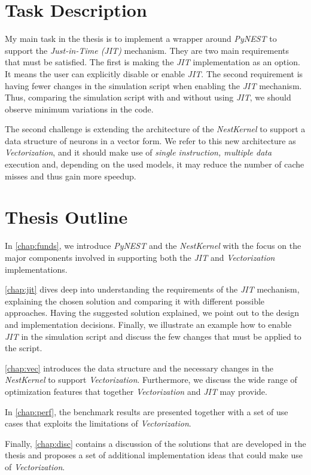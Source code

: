 \section{Task Description}
My main task in the thesis is to implement a wrapper around \emph{PyNEST} to support the \emph{Just-in-Time (JIT)} mechanism. They are two main requirements that must be satisfied. The first is making the \emph{JIT} implementation as an option. It means the user can explicitly disable or enable \emph{JIT}. The second requirement is having fewer changes in the simulation script when enabling the \emph{JIT} mechanism. Thus, comparing the simulation script with and without using \emph{JIT}, we should observe minimum variations in the code.

The second challenge is extending the architecture of the \emph{NestKernel} to support a data structure of neurons in a vector form. We refer to this new architecture as \emph{Vectorization}, and it should make use of \emph{single instruction, multiple data} execution and, depending on the used models, it may reduce the number of cache misses and thus gain more speedup.
\section{Thesis Outline}


In \autoref{chap:funds}, we introduce \emph{PyNEST} and the \emph{NestKernel} with the focus on the major components involved in supporting both the \emph{JIT} and \emph{Vectorization} implementations.

\autoref{chap:jit} dives deep into understanding the requirements of the \emph{JIT} mechanism, explaining the chosen solution and comparing it with different possible approaches. Having the suggested solution explained, we point out to the design and implementation decisions. Finally, we illustrate an example how to enable \emph{JIT} in the simulation script and discuss the few changes that must be applied to the script.

\autoref{chap:vec} introduces the data structure and the necessary changes in the \emph{NestKernel} to support \emph{Vectorization}. Furthermore, we discuss the wide range of optimization features that together \emph{Vectorization} and \emph{JIT} may provide.

In \autoref{chap:perf}, the benchmark results are presented together with a set of use cases that exploits the limitations of \emph{Vectorization}.

Finally, \autoref{chap:disc} contains a discussion of the solutions that are developed in the thesis and proposes a set of additional implementation ideas that could make use of \emph{Vectorization}.



\cleardoublepage

